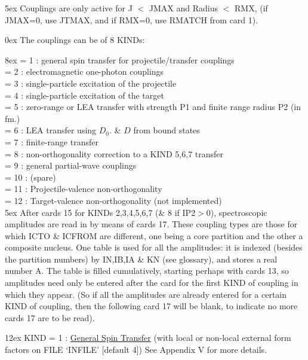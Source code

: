 \documentclass[11pt]{article}
\begin{document}
\hangindent 5ex
Couplings are only active for J $<$ JMAX and Radius $<$ RMX,
(if JMAX=0, use JTMAX, and if RMX=0, use  RMATCH from card 1).

\bigskip

\hangindent 0ex
The couplings can be of 8 KINDs:

\hangindent 8ex
            = 1 : general spin transfer for projectile/transfer couplings\\
            = 2 : electromagnetic one-photon couplings\\
            = 3 : single-particle excitation of the projectile\\
            = 4 : single-particle excitation of the target\\
            = 5 : zero-range or LEA transfer with strength P1 and
finite range radius P2 (in fm.)\\
            = 6 : LEA transfer using $D_0$. \& $D$ from bound states\\
            = 7 : finite-range transfer\\
            = 8 : non-orthogonality correction to a KIND 5,6,7 transfer\\
            = 9 : general partial-wave couplings\\
            = 10 : (spare)\\
            = 11 : Projectile-valence non-orthogonality\\
            = 12 : Target-valence non-orthogonality (not implemented)\\

\hangindent 5ex
After cards 15 for KINDs 2,3,4,5,6,7 (\& 8 if IP2$>$0),
spectroscopic amplitudes are read in by means of cards 17.
These coupling types are those for which ICTO \& ICFROM are
different, one being a core partition and the other a composite
nucleus. One table is used for all the amplitudes: it is indexed
(besides the partition numbers) by IN,IB,IA \& KN (see glossary),
and stores a real number A.
The table is filled cumulatively,
starting perhaps with cards 13,
so amplitudes need only be
entered after the card for the first KIND of coupling in which
they appear.
(So if all the amplitudes are already entered for a certain KIND
of coupling, then the following card 17 will be blank, to indicate
no more cards 17 are to be read).

\bigskip

\hangindent 12ex
KIND = 1 :
\underline{General Spin Transfer}
(with local or non-local external form factors on FILE `INFILE' [default 4])
See Appendix V for more details.
\end{document}
